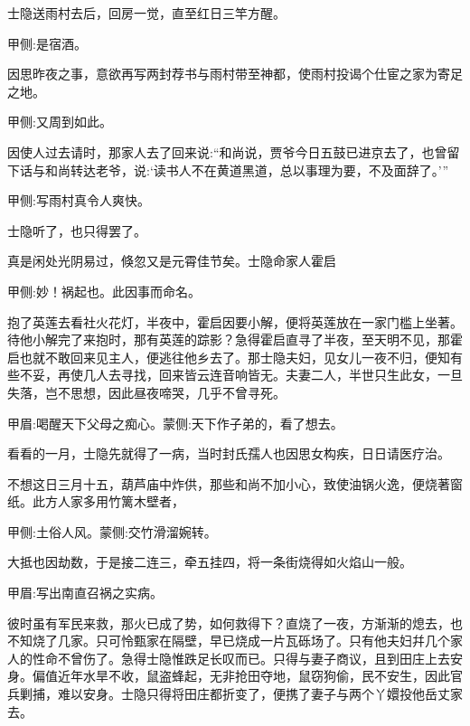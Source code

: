 \begin{parag}
    士隐送雨村去后，回房一觉，直至红日三竿方醒。\begin{note}甲侧:是宿酒。\end{note}因思昨夜之事，意欲再写两封荐书与雨村带至神都，使雨村投谒个仕宦之家为寄足之地。\begin{note}甲侧:又周到如此。\end{note}因使人过去请时，那家人去了回来说:“和尚说，贾爷今日五鼓已进京去了，也曾留下话与和尚转达老爷，说:‘读书人不在黄道黑道，总以事理为要，不及面辞了。’”\begin{note}甲侧:写雨村真令人爽快。\end{note}士隐听了，也只得罢了。
\end{parag}


\begin{parag}
    真是闲处光阴易过，倏忽又是元霄佳节矣。士隐命家人霍启\begin{note}甲侧:妙！祸起也。此因事而命名。\end{note}抱了英莲去看社火花灯，半夜中，霍启因要小解，便将英莲放在一家门槛上坐著。待他小解完了来抱时，那有英莲的踪影？急得霍启直寻了半夜，至天明不见，那霍启也就不敢回来见主人，便逃往他乡去了。那士隐夫妇，见女儿一夜不归，便知有些不妥，再使几人去寻找，回来皆云连音响皆无。夫妻二人，半世只生此女，一旦失落，岂不思想，因此昼夜啼哭，几乎不曾寻死。\begin{note}甲眉:喝醒天下父母之痴心。蒙侧:天下作子弟的，看了想去。\end{note}看看的一月，士隐先就得了一病，当时封氏孺人也因思女构疾，日日请医疗治。
\end{parag}


\begin{parag}
    不想这日三月十五，葫芦庙中炸供，那些和尚不加小心，致使油锅火逸，便烧著窗纸。此方人家多用竹篱木壁者，\begin{note}甲侧:土俗人风。蒙侧:交竹滑溜婉转。\end{note}大抵也因劫数，于是接二连三，牵五挂四，将一条街烧得如火焰山一般。\begin{note}甲眉:写出南直召祸之实病。\end{note}彼时虽有军民来救，那火已成了势，如何救得下？直烧了一夜，方渐渐的熄去，也不知烧了几家。只可怜甄家在隔壁，早已烧成一片瓦砾场了。只有他夫妇幷几个家人的性命不曾伤了。急得士隐惟跌足长叹而已。只得与妻子商议，且到田庄上去安身。偏值近年水旱不收，鼠盗蜂起，无非抢田夺地，鼠窃狗偷，民不安生，因此官兵剿捕，难以安身。士隐只得将田庄都折变了，便携了妻子与两个丫嬛投他岳丈家去。
\end{parag}


